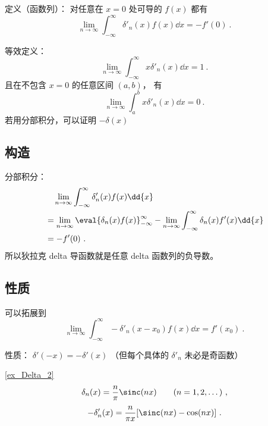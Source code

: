 
\begin{issues}
\issueDraft
\end{issues}


定义（函数列）： 对任意在 $x=0$ 处可导的 $f(x)$ 都有
\begin{equation}
\lim_{n\to\infty}\int_{-\infty}^\infty \delta'_n(x) f(x) \dd{x} = -f'(0)~.
\end{equation}

等效定义：
\begin{equation}
\lim_{n\to\infty}\int_{-\infty}^\infty x\delta'_n(x) \dd{x} = 1~.
\end{equation}
且在不包含 $x=0$ 的任意区间 $(a,b)$， 有
\begin{equation}
\lim_{n\to\infty}\int_a^b x\delta'_n(x) \dd{x} = 0~.
\end{equation}
若用分部积分，可以证明 $-\delta(x)$

\subsection{构造}
分部积分：
\begin{equation}
\begin{aligned}
&\quad \lim_{n\to\infty}\int_{-\infty}^\infty \delta'_n(x) f(x) \dd{x}\\
&= \lim_{n\to\infty}\eval{\delta_n(x) f(x)}_{-\infty}^\infty - \lim_{n\to\infty}\int_{-\infty}^\infty \delta_n(x) f'(x) \dd{x}\\
&= - f'(0)~.
\end{aligned}
\end{equation}
所以狄拉克 delta 导函数就是任意 delta 函数列的负导数。


\subsection{性质}
可以拓展到
\begin{equation}
\lim_{n\to\infty}\int_{-\infty}^\infty -\delta'_n(x-x_0) f(x) \dd{x} = f'(x_0)~.
\end{equation}

性质： $\delta'(-x) = -\delta'(x)$ （但每个具体的 $\delta'_n$ 未必是奇函数）

\begin{example}{}
\autoref{ex_Delta_2}~
\begin{equation}
\delta_n(x) = \frac{n}{\pi}\sinc(n x) \qquad (n = 1, 2, \dots)~,
\end{equation}
\begin{equation}
-\delta'_n(x) = \frac{n}{\pi x} [\sinc(nx) - \cos(nx)]~.
\end{equation}
\end{example}
